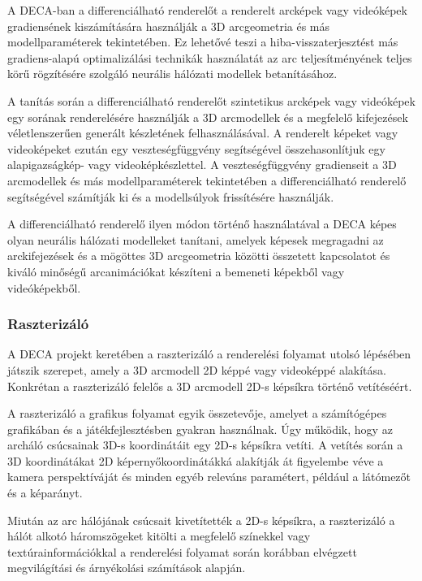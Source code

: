 \documentclass[12pt,a4]{article}
\begin{document}
                A DECA-ban a differenciálható renderelőt a renderelt arcképek vagy videóképek gradiensének kiszámítására használják a 3D arcgeometria és más modellparaméterek tekintetében. Ez lehetővé teszi a hiba-visszaterjesztést más gradiens-alapú optimalizálási technikák használatát az arc teljesítményének teljes körű rögzítésére szolgáló neurális hálózati modellek betanításához.

                A tanítás során a differenciálható renderelőt szintetikus arcképek vagy videóképek egy sorának renderelésére használják a 3D arcmodellek és a megfelelő kifejezések véletlenszerűen generált készletének felhasználásával. A renderelt képeket vagy videoképeket ezután egy veszteségfüggvény segítségével összehasonlítjuk egy alapigazságkép- vagy videoképkészlettel. A veszteségfüggvény gradienseit a 3D arcmodellek és más modellparaméterek tekintetében a differenciálható renderelő segítségével számítják ki és a modellsúlyok frissítésére használják.
                
                A differenciálható renderelő ilyen módon történő használatával a DECA képes olyan neurális hálózati modelleket tanítani, amelyek képesek megragadni az arckifejezések és a mögöttes 3D arcgeometria közötti összetett kapcsolatot és kiváló minőségű arcanimációkat készíteni a bemeneti képekből vagy videóképekből.

            \subsubsection{Raszterizáló}

                A DECA projekt keretében a raszterizáló a renderelési folyamat utolsó lépésében játszik szerepet, amely a 3D arcmodell 2D képpé vagy videoképpé alakítása. Konkrétan a raszterizáló felelős a 3D arcmodell 2D-s képsíkra történő vetítéséért.

                A raszterizáló a grafikus folyamat egyik összetevője, amelyet a számítógépes grafikában és a játékfejlesztésben gyakran használnak. Úgy működik, hogy az archáló csúcsainak 3D-s koordinátáit egy 2D-s képsíkra vetíti. A vetítés során a 3D koordinátákat 2D képernyőkoordinátákká alakítják át figyelembe véve a kamera perspektíváját és minden egyéb releváns paramétert, például a látómezőt és a képarányt.
                
                Miután az arc hálójának csúcsait kivetítették a 2D-s képsíkra, a raszterizáló a hálót alkotó háromszögeket kitölti a megfelelő színekkel vagy textúrainformációkkal a renderelési folyamat során korábban elvégzett megvilágítási és árnyékolási számítások alapján.
                
\end{document}
